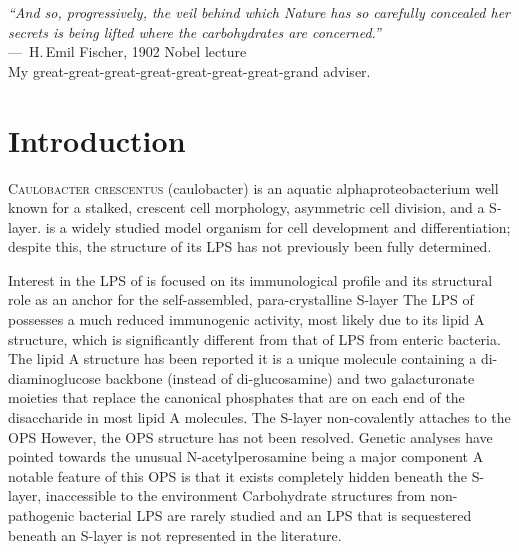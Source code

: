 \acresetall
{}

\begin{epigraph}
  \emph{``And so, progressively, the veil behind which Nature has so carefully concealed her secrets
    is being lifted where the carbohydrates are concerned.''} \\---~H.\,Emil Fischer, 1902 Nobel
  lecture\\ My great-great-great-great-great-great-great-grand adviser.
\end{epigraph}
\section{Introduction} %
\label{sec:lps_introduction} 
\lettrine[lines=2]{C}{aulobacter crescentus} (\acs{caulobacter}) is an aquatic alphaproteobacterium
well known for a stalked, crescent cell morphology, asymmetric cell division, and a
\ac{S-layer}. \caulobacter is a widely studied model organism for cell development and
differentiation; despite this, the structure of its \ac{LPS} has not previously been fully
determined.

Interest in the \ac{LPS} of \caulobacter is focused on its immunological
profile and its structural role as an anchor for the
self-assembled, para-crystalline \ac{S-layer} The \ac{LPS}
of \caulobacter possesses a much reduced immunogenic activity, most likely due
to its lipid A structure, which is significantly different from that of
\ac{LPS} from enteric bacteria. The lipid A structure has been
reported it is a unique molecule containing a
di-diaminoglucose backbone (instead of di-glucosamine) and two galacturonate
moieties that replace the canonical phosphates that are on each end of the
disaccharide in most lipid A molecules. The \caulobacter \ac{S-layer}
non-covalently attaches to the \ac{OPS} However, the
\ac{OPS} structure has not been resolved. Genetic analyses have pointed
towards the unusual N-acetylperosamine being a major
component A notable feature of this \ac{OPS} is that it
exists completely hidden beneath the \ac{S-layer}, inaccessible to the
environment Carbohydrate structures from non-pathogenic
bacterial \ac{LPS} are rarely studied and an \ac{LPS} that is sequestered
beneath an \ac{S-layer} is not represented in the literature.
 
